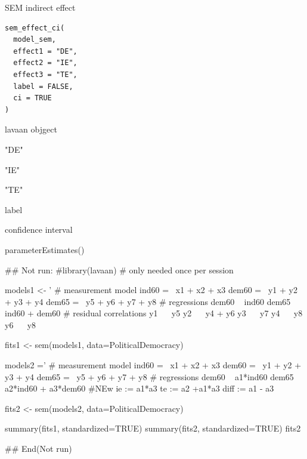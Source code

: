 \documentclass[a4paper]{book}
\begin{document}
%
\begin{Description}
SEM indirect effect
\end{Description}
%
\begin{Usage}
\begin{verbatim}
sem_effect_ci(
  model_sem,
  effect1 = "DE",
  effect2 = "IE",
  effect3 = "TE",
  label = FALSE,
  ci = TRUE
)
\end{verbatim}
\end{Usage}
%
\begin{Arguments}
\begin{ldescription}
\item[\code{model\_sem}] lavaan objgect

\item[\code{effect1}] "DE"

\item[\code{effect2}] "IE"

\item[\code{effect3}] "TE"

\item[\code{label}] label

\item[\code{ci}] confidence interval
\end{ldescription}
\end{Arguments}
%
\begin{Value}
parameterEstimates()
\end{Value}
%
\begin{Examples}
\begin{ExampleCode}

## Not run: 
#library(lavaan) # only needed once per session

models1 <- '
  # measurement model
    ind60 =~ x1 + x2 + x3
    dem60 =~ y1 + y2 + y3 + y4
    dem65 =~ y5 + y6 + y7 + y8
    # regressions
    dem60 ~ ind60
    dem65 ~ ind60 + dem60
      # residual correlations
    y1 ~~ y5
    y2 ~~ y4 + y6
    y3 ~~ y7
    y4 ~~ y8
    y6 ~~ y8

fits1 <- sem(models1, data=PoliticalDemocracy)


models2 ='
  # measurement model
    ind60 =~ x1 + x2 + x3
    dem60 =~ y1 + y2 + y3 + y4
    dem65 =~ y5 + y6 + y7 + y8
     # regressions
    dem60 ~ a1*ind60
    dem65 ~ a2*ind60 + a3*dem60
 #NEw
   ie := a1*a3
   te := a2 +a1*a3
   diff := a1 - a3

fits2 <- sem(models2, data=PoliticalDemocracy)

summary(fits1, standardized=TRUE)
summary(fits2, standardized=TRUE)
fits2 %

## End(Not run)

\end{ExampleCode}
\end{Examples}
\end{document}
